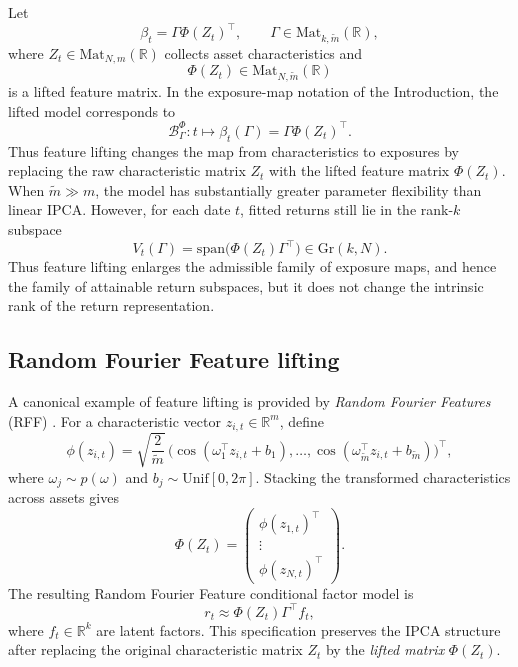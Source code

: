 \documentclass[11pt,letterpaper]{article}
\newcommand{\gr}{\mathrm{Gr}}
\newcommand{\bR}{\mathbb{R}}
\newcommand{\cB}{\mathcal{B}}
\begin{document}
Let
\begin{equation}
\label{eq:liftedlinspec}
\beta_t=\Gamma \Phi(Z_t)^\top,\qquad\Gamma \in \mathrm{Mat}_{k,\tilde m}(\bR),
\end{equation}
where $Z_t\in \mathrm{Mat}_{N,m}(\bR)$ collects asset characteristics and
\begin{equation*}
\Phi(Z_t)\in \mathrm{Mat}_{N,\tilde m}(\bR)
\end{equation*}
is a lifted feature matrix. In the exposure-map notation of the Introduction, the lifted model corresponds to
\begin{equation*}
\cB_\Gamma^\Phi : t \mapsto \beta_t(\Gamma)=\Gamma\Phi(Z_t)^\top .
\end{equation*}
Thus feature lifting changes the map from characteristics to exposures by replacing the raw characteristic matrix $Z_t$ with the lifted feature matrix $\Phi(Z_t)$. When $\tilde m \gg m$, the model has substantially greater parameter flexibility than linear IPCA. However, for each date $t$, fitted returns still lie in the rank-$k$ subspace
\begin{equation}
\label{eq:rff-subspace}
V_t(\Gamma)=\mathrm{span}\big(\Phi(Z_t)\Gamma^\top\big) \in \gr(k,N).
\end{equation}
Thus feature lifting enlarges the admissible family of exposure maps, and hence the family of attainable return subspaces, but it does not change the intrinsic rank of the return representation.

\subsection{Random Fourier Feature lifting}
\label{subsec:rff-lifting}

A canonical example of feature lifting is provided by \emph{Random Fourier Features} (RFF) \cite{RR07,RR08}. For a characteristic vector $z_{i,t}\in\bR^m$, define
\begin{equation}
\label{eq:rff-map}
\phi(z_{i,t})=\sqrt{\frac{2}{\tilde m}}\,
\big(
\cos(\omega_1^\top z_{i,t}+b_1),\dots,
\cos(\omega_{\tilde m}^\top z_{i,t}+b_{\tilde m})
\big)^\top,
\end{equation}
where $\omega_j\sim p(\omega)$ and $b_j\sim\mathrm{Unif}[0,2\pi]$. Stacking the transformed characteristics across assets gives
\begin{equation}
\label{eq:rff-design}
\Phi(Z_t)=
\begin{pmatrix}
\phi(z_{1,t})^\top \\
\vdots             \\
\phi(z_{N,t})^\top
\end{pmatrix}.
\end{equation}
The resulting Random Fourier Feature conditional factor model is
\begin{equation}
\label{eq:rff-factor-model}
r_t \approx \Phi(Z_t)\Gamma^\top f_t,
\end{equation}
where $f_t\in\bR^k$ are latent factors. This specification preserves the IPCA structure after replacing the original characteristic matrix $Z_t$ by the \emph{lifted matrix} $\Phi(Z_t)$.
\end{document}
